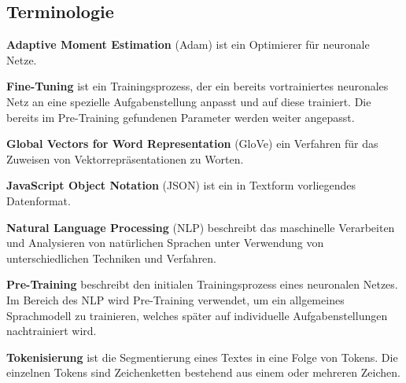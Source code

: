 

\pagebreak
\subsection{Terminologie}

\textbf{Adaptive Moment Estimation} (Adam) ist ein Optimierer für neuronale Netze.

\textbf{Fine-Tuning} ist ein Trainingsprozess, der ein bereits vortrainiertes neuronales Netz an eine spezielle Aufgabenstellung anpasst und auf diese trainiert. Die bereits im Pre-Training gefundenen Parameter werden weiter angepasst.

\textbf{Global Vectors for Word Representation} (GloVe) ein Verfahren für das Zuweisen von Vektorrepräsentationen zu Worten.

\textbf{JavaScript Object Notation} (JSON) ist ein in Textform vorliegendes Datenformat.

\textbf{Natural Language Processing} (NLP) beschreibt das maschinelle Verarbeiten und Analysieren von natürlichen Sprachen unter Verwendung von unterschiedlichen Techniken und Verfahren. 

\textbf{Pre-Training} beschreibt den initialen Trainingsprozess eines neuronalen Netzes. Im Bereich des NLP wird Pre-Training verwendet, um ein allgemeines Sprachmodell zu trainieren, welches später auf individuelle Aufgabenstellungen nachtrainiert wird.

\textbf{Tokenisierung} ist die Segmentierung eines Textes in eine Folge von Tokens. Die einzelnen Tokens sind Zeichenketten bestehend aus einem oder mehreren Zeichen.

\pagebreak
